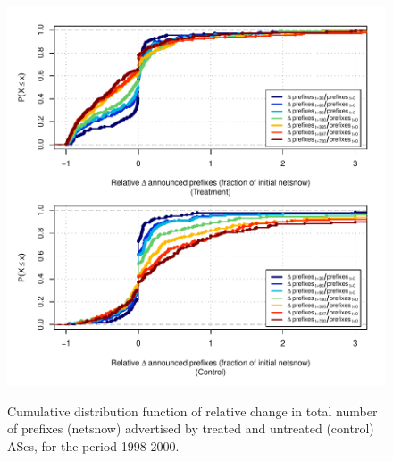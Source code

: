 \begin{figure}[H]
\begin{centering}
\begin{singlespace}
\captionsetup{list=no}
    \includegraphics[width=6in]{figures/behavior-rel_netsnow-1998_2000-corr.pdf}
    \vspace{-2em}\\
    \caption{Cumulative distribution function of relative change in total
    number of prefixes (netsnow) advertised by treated and untreated (control)
    ASes, for the period 1998-2000.}
\end{singlespace}
\end{centering}
\end{figure}

